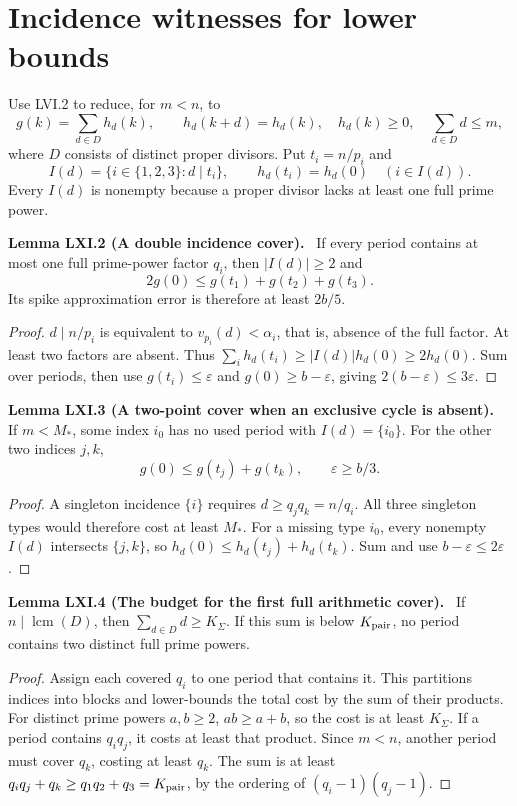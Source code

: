 \documentclass[11pt,a4paper,oneside]{book}
\DeclareMathOperator{\lcm}{lcm}\DeclareMathOperator{\spanR}{span_{\mathbb R}}
\newcommand{\statement}[3]{\par\medskip\noindent\textbf{#1 #2 (#3).}\ }
\begin{document}
\section{Incidence witnesses for lower bounds}
Use LVI.2 to reduce, for $m<n$, to
\begin{equation}g(k)=\sum_{d\in D}h_d(k),\qquad h_d(k+d)=h_d(k),\quad h_d(k)\ge0,\quad\sum_{d\in D}d\le m,\tag{386}\end{equation}
where $D$ consists of distinct proper divisors. Put $t_i=n/p_i$ and
\begin{equation}I(d)=\{i\in\{1,2,3\}:d\mid t_i\},\qquad h_d(t_i)=h_d(0)\quad(i\in I(d)).\tag{387}\end{equation}
Every $I(d)$ is nonempty because a proper divisor lacks at least one full prime power.
\statement{Lemma}{LXI.2}{A double incidence cover}
If every period contains at most one full prime-power factor $q_i$, then $|I(d)|\ge2$ and
\begin{equation}2g(0)\le g(t_1)+g(t_2)+g(t_3).\tag{388}\end{equation}
Its spike approximation error is therefore at least $2b/5$.
\begin{proof}
$d\mid n/p_i$ is equivalent to $v_{p_i}(d)<\alpha_i$, that is, absence of the full factor. At least two factors are absent. Thus $\sum_ih_d(t_i)\ge|I(d)|h_d(0)\ge2h_d(0)$. Sum over periods, then use $g(t_i)\le\varepsilon$ and $g(0)\ge b-\varepsilon$, giving $2(b-\varepsilon)\le3\varepsilon$.
\end{proof}
\statement{Lemma}{LXI.3}{A two-point cover when an exclusive cycle is absent}
If $m<M_*$, some index $i_0$ has no used period with $I(d)=\{i_0\}$. For the other two indices $j,k$,
\begin{equation}g(0)\le g(t_j)+g(t_k),\qquad\varepsilon\ge b/3.\tag{389}\end{equation}
\begin{proof}
A singleton incidence $\{i\}$ requires $d\ge q_jq_k=n/q_i$. All three singleton types would therefore cost at least $M_*$. For a missing type $i_0$, every nonempty $I(d)$ intersects $\{j,k\}$, so $h_d(0)\le h_d(t_j)+h_d(t_k)$. Sum and use $b-\varepsilon\le2\varepsilon$.
\end{proof}
\statement{Lemma}{LXI.4}{The budget for the first full arithmetic cover}
If $n\mid\lcm(D)$, then $\sum_{d\in D}d\ge K_\Sigma$. If this sum is below $K_{\rm pair}$, no period contains two distinct full prime powers.
\begin{proof}
Assign each covered $q_i$ to one period that contains it. This partitions indices into blocks and lower-bounds the total cost by the sum of their products. For distinct prime powers $a,b\ge2$, $ab\ge a+b$, so the cost is at least $K_\Sigma$. If a period contains $q_iq_j$, it costs at least that product. Since $m<n$, another period must cover $q_k$, costing at least $q_k$. The sum is at least $q_iq_j+q_k\ge q_1q_2+q_3=K_{\rm pair}$, by the ordering of $(q_i-1)(q_j-1)$.
\end{proof}
\end{document}
